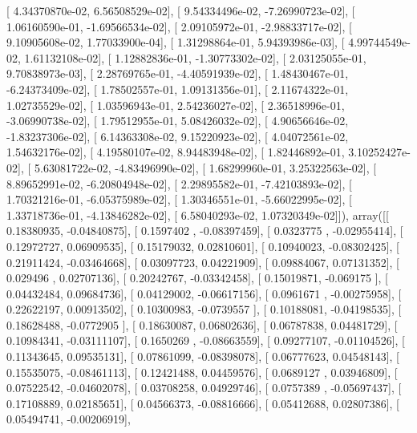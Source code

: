 \documentclass{article}
\begin{document}
       [  4.34370870e-02,   6.56508529e-02],
       [  9.54334496e-02,  -7.26990723e-02],
       [  1.06160590e-01,  -1.69566534e-02],
       [  2.09105972e-01,  -2.98833717e-02],
       [  9.10905608e-02,   1.77033900e-04],
       [  1.31298864e-01,   5.94393986e-03],
       [  4.99744549e-02,   1.61132108e-02],
       [  1.12882836e-01,  -1.30773302e-02],
       [  2.03125055e-01,   9.70838973e-03],
       [  2.28769765e-01,  -4.40591939e-02],
       [  1.48430467e-01,  -6.24373409e-02],
       [  1.78502557e-01,   1.09131356e-01],
       [  2.11674322e-01,   1.02735529e-02],
       [  1.03596943e-01,   2.54236027e-02],
       [  2.36518996e-01,  -3.06990738e-02],
       [  1.79512955e-01,   5.08426032e-02],
       [  4.90656646e-02,  -1.83237306e-02],
       [  6.14363308e-02,   9.15220923e-02],
       [  4.04072561e-02,   1.54632176e-02],
       [  4.19580107e-02,   8.94483948e-02],
       [  1.82446892e-01,   3.10252427e-02],
       [  5.63081722e-02,  -4.83496990e-02],
       [  1.68299960e-01,   3.25322563e-02],
       [  8.89652991e-02,  -6.20804948e-02],
       [  2.29895582e-01,  -7.42103893e-02],
       [  1.70321216e-01,  -6.05375989e-02],
       [  1.30346551e-01,  -5.66022995e-02],
       [  1.33718736e-01,  -4.13846282e-02],
       [  6.58040293e-02,   1.07320349e-02]]), array([[ 0.18380935, -0.04840875],
       [ 0.1597402 , -0.08397459],
       [ 0.0323775 , -0.02955414],
       [ 0.12972727,  0.06909535],
       [ 0.15179032,  0.02810601],
       [ 0.10940023, -0.08302425],
       [ 0.21911424, -0.03464668],
       [ 0.03097723,  0.04221909],
       [ 0.09884067,  0.07131352],
       [ 0.029496  ,  0.02707136],
       [ 0.20242767, -0.03342458],
       [ 0.15019871, -0.069175  ],
       [ 0.04432484,  0.09684736],
       [ 0.04129002, -0.06617156],
       [ 0.0961671 , -0.00275958],
       [ 0.22622197,  0.00913502],
       [ 0.10300983, -0.0739557 ],
       [ 0.10188081, -0.04198535],
       [ 0.18628488, -0.0772905 ],
       [ 0.18630087,  0.06802636],
       [ 0.06787838,  0.04481729],
       [ 0.10984341, -0.03111107],
       [ 0.1650269 , -0.08663559],
       [ 0.09277107, -0.01104526],
       [ 0.11343645,  0.09535131],
       [ 0.07861099, -0.08398078],
       [ 0.06777623,  0.04548143],
       [ 0.15535075, -0.08461113],
       [ 0.12421488,  0.04459576],
       [ 0.0689127 ,  0.03946809],
       [ 0.07522542, -0.04602078],
       [ 0.03708258,  0.04929746],
       [ 0.0757389 , -0.05697437],
       [ 0.17108889,  0.02185651],
       [ 0.04566373, -0.08816666],
       [ 0.05412688,  0.02807386],
       [ 0.05494741, -0.00206919],
\end{document}
